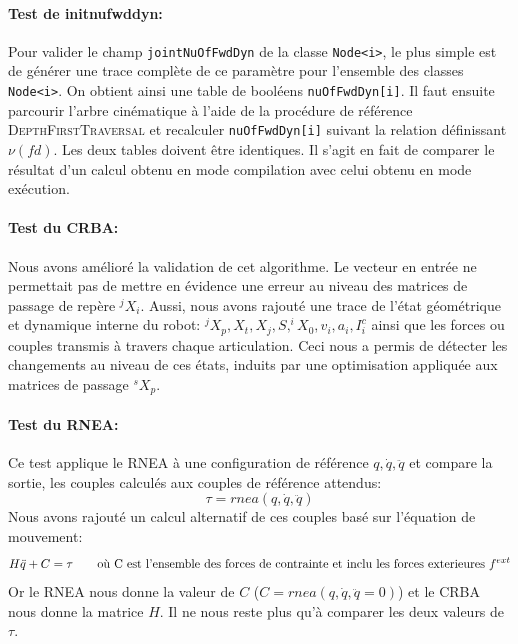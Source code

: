\documentclass{report}
\begin{document}
\paragraph{Test de initnufwddyn:}
Pour valider le champ \verb;jointNuOfFwdDyn; de la classe \verb;Node<i>;, le plus simple est de générer une trace complète de ce paramètre pour l'ensemble des classes \verb;Node<i>;. On obtient ainsi une table de booléens \verb;nuOfFwdDyn[i];. Il faut ensuite parcourir l'arbre cinématique à l'aide de la procédure de référence \textsc{DepthFirstTraversal} et recalculer \verb;nuOfFwdDyn[i]; suivant la relation définissant $\nu(fd)$. Les deux tables doivent être identiques. Il s'agit en fait de comparer le résultat d'un calcul obtenu en mode compilation avec celui obtenu en mode exécution.

\paragraph{Test du CRBA:}
Nous avons amélioré la validation de  cet algorithme. Le vecteur en entrée ne permettait pas de mettre en évidence une erreur au niveau des matrices de passage de repère $^jX_i$. Aussi, nous avons rajouté une trace de l'état géométrique et dynamique interne du robot: $^jX_p, X_t, X_j, S, ^iX_0, v_i, a_i, I_i^c$ ainsi que les forces ou couples transmis à travers chaque articulation. Ceci nous a permis de détecter les changements au niveau de ces états, induits par une optimisation appliquée aux matrices de passage $^sX_p$.

\paragraph{Test du RNEA:}
Ce test applique le RNEA à une configuration de référence $q, \dot{q}, \ddot{q}$ et compare la sortie, \cad les couples calculés aux couples de référence attendus:
\begin{equation*}
\tau = rnea(q,\dot{q},\ddot{q})
\end{equation*}
Nous avons rajouté un calcul alternatif de ces couples basé sur l'équation de mouvement:
\begin{equation*}
H \ddot{q} + C = \tau \qquad \textnormal{où C est l'ensemble des forces de contrainte et inclu les forces exterieures $f^{ext}$}
\end{equation*}  
Or le RNEA nous donne la valeur de $C$ ($C = rnea(q,\dot{q},\ddot{q}=0)$) et le CRBA nous donne la matrice $H$. Il ne nous reste plus qu'à comparer les deux valeurs de $\tau$.
\end{document}
